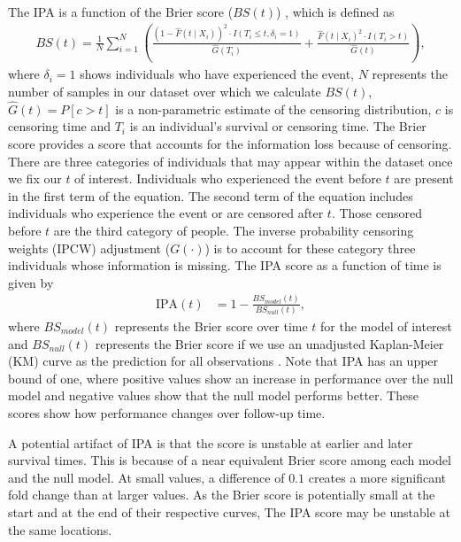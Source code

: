 \documentclass[APA,LATO1COL]{WileyNJD-v2}
\begin{document}
The IPA is a function of the Brier score (\(BS(t)\)) \citep{graf1999},
which is defined as \begin{align}
BS(t)=\frac{1}{N}\sum^{N}_{i=1}\left(\frac{\left(1 - \widehat{F}(t \mid X_{i})\right)^{2}\cdot I(T_{i}\leq t,\delta_{i}=1)}{\widehat{G}(T_{i})} + \frac{\widehat{F}(t\mid X_{i})^{2}\cdot I(T_{i}>t)}{\widehat{G}(t)}\right),
\end{align} where \(\delta_{i}=1\) shows individuals who have
experienced the event, \(N\) represents the number of samples in our
dataset over which we calculate \(BS(t)\), \(\widehat{G}(t)=P[c>t]\) is
a non-parametric estimate of the censoring distribution, \(c\) is
censoring time and \(T_{i}\) is an individual's survival or censoring
time. The Brier score provides a score that accounts for the information
loss because of censoring. There are three categories of individuals
that may appear within the dataset once we fix our \(t\) of interest.
Individuals who experienced the event before \(t\) are present in the
first term of the equation. The second term of the equation includes
individuals who experience the event or are censored after \(t\). Those
censored before \(t\) are the third category of people. The inverse
probability censoring weights (IPCW) adjustment (\(G(\cdot)\)) is to
account for these category three individuals whose information is
missing. The IPA score as a function of time is given by \begin{align}
\textrm{IPA}(t) &= 1-\frac{BS_{model}(t)}{BS_{null}(t)}, \nonumber
\end{align} where \(BS_{model}(t)\) represents the Brier score over time
\(t\) for the model of interest and \(BS_{null}(t)\) represents the
Brier score if we use an unadjusted Kaplan-Meier (KM) curve as the
prediction for all observations \citep{kattan2018index}. Note that IPA
has an upper bound of one, where positive values show an increase in
performance over the null model and negative values show that the null
model performs better. These scores show how performance changes over
follow-up time.

A potential artifact of IPA is that the score is unstable at earlier and
later survival times. This is because of a near equivalent Brier score
among each model and the null model. At small values, a difference of
\(0.1\) creates a more significant fold change than at larger values. As
the Brier score is potentially small at the start and at the end of
their respective curves, The IPA score may be unstable at the same
locations.
\end{document}
